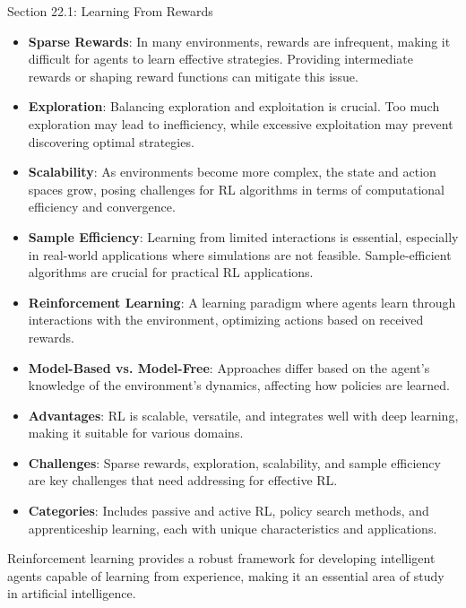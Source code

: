 \begin{notes}{Section 22.1: Learning From Rewards}
\begin{highlight}
        \begin{itemize}
            \item \textbf{Sparse Rewards}: In many environments, rewards are infrequent, making it difficult for agents to learn effective strategies. Providing intermediate rewards or shaping reward 
            functions can mitigate this issue.
            \item \textbf{Exploration}: Balancing exploration and exploitation is crucial. Too much exploration may lead to inefficiency, while excessive exploitation may prevent discovering optimal strategies.
            \item \textbf{Scalability}: As environments become more complex, the state and action spaces grow, posing challenges for RL algorithms in terms of computational efficiency and convergence.
            \item \textbf{Sample Efficiency}: Learning from limited interactions is essential, especially in real-world applications where simulations are not feasible. Sample-efficient algorithms are crucial 
            for practical RL applications.
        \end{itemize}
    
    \end{highlight}
    
    \begin{highlight}
    
        \begin{itemize}
            \item \textbf{Reinforcement Learning}: A learning paradigm where agents learn through interactions with the environment, optimizing actions based on received rewards.
            \item \textbf{Model-Based vs. Model-Free}: Approaches differ based on the agent's knowledge of the environment's dynamics, affecting how policies are learned.
            \item \textbf{Advantages}: RL is scalable, versatile, and integrates well with deep learning, making it suitable for various domains.
            \item \textbf{Challenges}: Sparse rewards, exploration, scalability, and sample efficiency are key challenges that need addressing for effective RL.
            \item \textbf{Categories}: Includes passive and active RL, policy search methods, and apprenticeship learning, each with unique characteristics and applications.
        \end{itemize}
    
        Reinforcement learning provides a robust framework for developing intelligent agents capable of learning from experience, making it an essential area of study in artificial intelligence.
    
    \end{highlight}
\end{notes}

